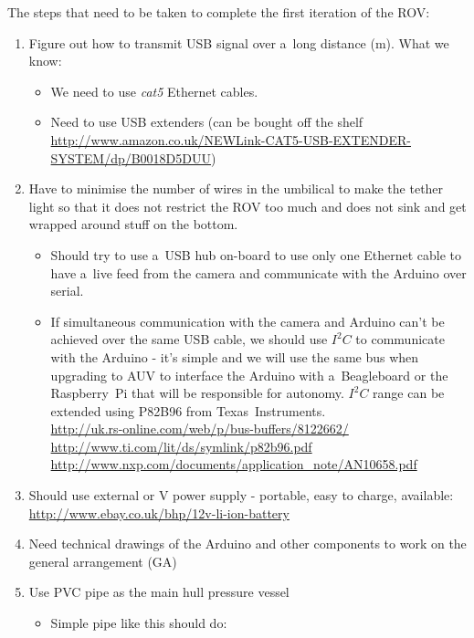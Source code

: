 \documentclass[11pt,a4paper,oneside]{report}
\begin{document}
The steps that need to be taken to complete the first iteration of the ROV:

\begin{enumerate}
\item Figure out how to transmit USB signal over a~long distance (\unit[50]{m}). What we know:
	\begin{itemize}
	\item We need to use \emph{cat5} Ethernet cables.
	\item Need to use USB extenders (can be bought off the shelf \\
		\url{http://www.amazon.co.uk/NEWLink-CAT5-USB-EXTENDER-SYSTEM/dp/B0018D5DUU})
	\end{itemize}
\item Have to minimise the number of wires in the umbilical to make the tether light
	so that it does not restrict the ROV too much and does not sink and get wrapped around stuff on the bottom.
	\begin{itemize}
	\item Should try to use a~USB hub on-board to use only one Ethernet cable to have
		a~live feed from the camera and communicate with the Arduino over serial.
	\item If simultaneous communication with the camera and Arduino can't be achieved over
		the same USB cable, we should use $I^2C$ to communicate with the Arduino - it's simple
		and we will use the same bus when upgrading to AUV to interface the Arduino with
		a~Beagleboard or the Raspberry~Pi that will be responsible for autonomy.
		$I^2C$ range can be extended using P82B96 from Texas~Instruments. \\
			\url{http://uk.rs-online.com/web/p/bus-buffers/8122662/} \\
			\url{http://www.ti.com/lit/ds/symlink/p82b96.pdf} \\
			\url{http://www.nxp.com/documents/application_note/AN10658.pdf}
	\end{itemize}
\item Should use external \unit[9]{} or \unit[12]{V} power supply - portable,
	easy to charge, available: \\
	\url{http://www.ebay.co.uk/bhp/12v-li-ion-battery}
\item Need technical drawings of the Arduino and other components to work on the general arrangement (GA)
\item Use PVC pipe as the main hull pressure vessel
	\begin{itemize}
	\item Simple pipe like this should do: \\

\end{itemize}
\end{enumerate}
\end{document}
